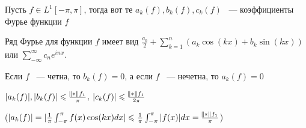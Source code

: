 \begin{definition}
    Пусть $f\in L^1[-\pi, \pi]$, тогда вот те $a_k(f), b_k(f), c_k(f)$ ~--- коэффициенты Фурье функции $f$

    Ряд Фурье для функции $f$ имеет вид $\frac{a_0}{2} + \sum_{k = 1}^n(a_k \cos(kx) + b_k\sin(kx))$
    или $\sum_{-\infty}^\infty c_n e^{inx}$.
\end{definition}

\begin{observation}
    Если $f$ ~--- четна, то $b_k(f) = 0$, а если $f$ ~--- нечетна, то $a_k(f) = 0$

    $|a_k(f)|, |b_k(f)|\le \frac{\norm{f}_1}{\pi}$, $|c_k(f)|\le \frac{\norm{f}_1}{2\pi}$

    ($|a_k(f)| = |\frac{1}{\pi}\int_{-\pi}^\pi f(x)\cos(kx)dx|\le  \frac{1}{\pi}\int_{-\pi}^\pi |f(x)|dx = \frac{\norm{f}_1}{\pi}$)
\end{observation}


\newpage

